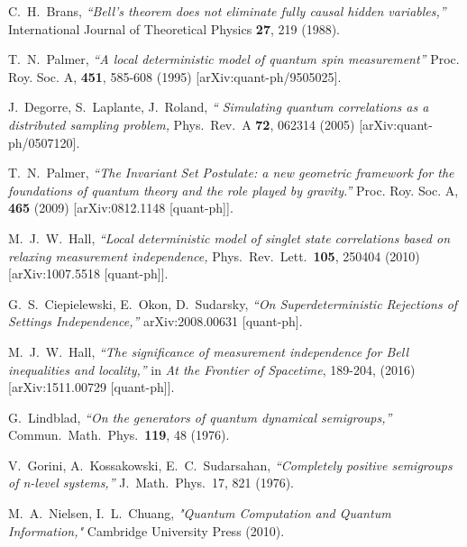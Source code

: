 \documentclass[12pt]{article}
\begin{document}
\begin{thebibliography}{99}
{   C.~H.~Brans, {\sl ``Bell's theorem does not eliminate fully causal hidden variables,''} International Journal of Theoretical Physics {\bf 27}, 219 (1988).
  
  T.~N.~Palmer,
  {\sl ``A local deterministic model of quantum spin measurement''}
  Proc. Roy. Soc. A, {\bf 451}, 585-608 (1995) 	[arXiv:quant-ph/9505025]. 



J.~Degorre, S.~Laplante, J.~Roland,  {\sl ``  Simulating quantum correlations as a distributed sampling problem,} Phys.\ Rev.\ A {\bf 72}, 062314 (2005) [arXiv:quant-ph/0507120].

  T.~N.~Palmer,
  {\sl ``The Invariant Set Postulate: a new geometric framework for the foundations of quantum theory and the role played by gravity.''}
  Proc. Roy. Soc. A, {\bf 465} (2009) 	[arXiv:0812.1148 [quant-ph]]. 

 M.~J.~W.~Hall, {\sl ``Local deterministic model of singlet state correlations based on relaxing measurement independence,} Phys.\ Rev.\ Lett.\ {\bf 105}, 250404 (2010) 
[arXiv:1007.5518 [quant-ph]].


 G.~S.~Ciepielewski, E.~Okon, D.~Sudarsky, {\sl ``On Superdeterministic Rejections of Settings Independence,''} 	arXiv:2008.00631 [quant-ph].

     M.~J.~W.~Hall, {\sl ``The significance of measurement independence for Bell inequalities and locality,''} in {\sl At the Frontier of Spacetime},  189-204, (2016) [arXiv:1511.00729 [quant-ph]].

 

  
    

G.~Lindblad, {\sl ``On the generators of quantum dynamical semigroups,''} Commun.\ Math.\ Phys.\ {\bf 119}, 48 (1976).


 V.~Gorini, A.~Kossakowski, E.~C.~Sudarsahan, {\sl ``Completely positive semigroups
of n-level systems,''} J.\ Math.\ Phys.\ 17, 821 (1976).

M.~A.~Nielsen, I.~L.~Chuang, {\sl "Quantum Computation and Quantum Information,"} Cambridge University Press (2010). 

}
\end{thebibliography}
\end{document}
